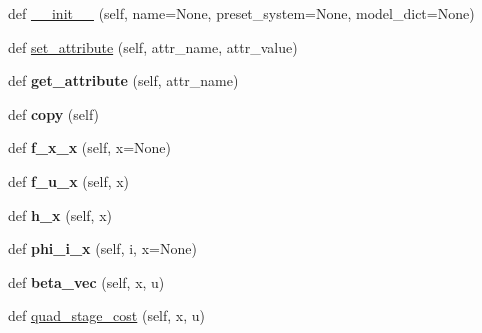 \begin{DoxyCompactItemize}
\item 
def \mbox{\hyperlink{classgddp_1_1system_1_1_system_afad3a747302ae7115f6776469c58a369}{\+\_\+\+\_\+init\+\_\+\+\_\+}} (self, name=None, preset\+\_\+system=None, model\+\_\+dict=None)
\item 
def \mbox{\hyperlink{classgddp_1_1system_1_1_system_ade878bad851950e1aaff8a2b2ff8d2b8}{set\+\_\+attribute}} (self, attr\+\_\+name, attr\+\_\+value)
\item 
\mbox{\label{classgddp_1_1system_1_1_system_a3df4bd8b57c6be8de934a39d8c8eb553}} 
def {\bfseries get\+\_\+attribute} (self, attr\+\_\+name)
\item 
\mbox{\label{classgddp_1_1system_1_1_system_a2bf81c744621f069a951d8a3be0c24e7}} 
def {\bfseries copy} (self)
\item 
\mbox{\label{classgddp_1_1system_1_1_system_a850a70a8f9cb299c3b60564d93507480}} 
def {\bfseries f\+\_\+x\+\_\+x} (self, x=None)
\item 
\mbox{\label{classgddp_1_1system_1_1_system_a06b3bad703d0ee1a0f523a353f972ac6}} 
def {\bfseries f\+\_\+u\+\_\+x} (self, x)
\item 
\mbox{\label{classgddp_1_1system_1_1_system_a247598c691a266abd037e431f07f33ef}} 
def {\bfseries h\+\_\+x} (self, x)
\item 
\mbox{\label{classgddp_1_1system_1_1_system_ab4dda5dd74991ecbd7cf95c727a1f955}} 
def {\bfseries phi\+\_\+i\+\_\+x} (self, i, x=None)
\item 
\mbox{\label{classgddp_1_1system_1_1_system_a8d7eacda61a1129f5457bb650a9c41f9}} 
def {\bfseries beta\+\_\+vec} (self, x, u)
\item 
def \mbox{\hyperlink{classgddp_1_1system_1_1_system_acf956449a60ee65e8b58627074ed56d2}{quad\+\_\+stage\+\_\+cost}} (self, x, u)
\item 
\mbox{\label{classgddp_1_1system_1_1_system_a2fde02f2c9b418ab0d7b0554113136d8}} 

\end{DoxyCompactItemize}
